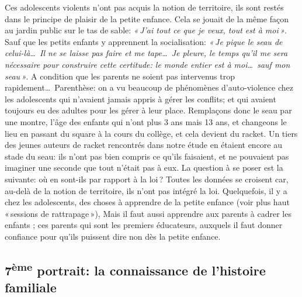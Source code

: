 \documentclass[11pt]{article} %
\begin{document}
  Ces adolescents violents n'ont pas acquis la notion de territoire, ils sont restés dans le principe de plaisir de la petite enfance. Cela se jouait de la même façon au jardin public sur le tas de sable: \textit{« J'ai tout ce que je veux, tout est à moi »}. Sauf que les petits enfants y apprennent la socialisation: \textit{« Je pique le seau de celui-là\dots\ Il ne se laisse pas faire et me tape\dots\ Je pleure, le temps qu'il me sera nécessaire pour construire cette certitude: le monde entier est à moi\dots\ sauf mon seau »}. A condition que les parents ne soient pas intervenus trop rapidement\dots\ Parenthèse: on a vu beaucoup de phénomènes d'auto-violence chez les adolescents qui n'avaient jamais appris à gérer les conflits; et qui avaient toujours eu des adultes pour les gérer à leur place.\newline
  Remplaçons donc le seau par une montre, l'âge des enfants qui n'ont plus 3 ans mais 13 ans, et changeons le lieu en passant du square à la cours du collège, et cela devient du racket. Un tiers des jeunes auteurs de racket rencontrés dans notre étude en étaient encore au stade du seau: ils n'ont pas bien compris ce qu'ils faisaient, et ne pouvaient pas imaginer une seconde que tout n'était pas à eux. La question à se poser est la suivante: où en sont-ils par rapport à la loi ?\newline
  Toutes les données se croisent car, au-delà de la notion de territoire, ils n'ont pas intégré la loi. Quelquefois, il y a chez les adolescents, des choses à apprendre de la petite enfance (voir plus haut « sessions de rattrapage »), Mais il faut aussi apprendre aux parents à cadrer les enfants ; ces parents qui sont les premiers éducateurs, auxquels il faut donner confiance pour qu'ils puissent dire non dès la petite enfance.

\subsection{7\textsuperscript{ème} portrait: la connaissance de l'histoire familiale }
\end{document}
